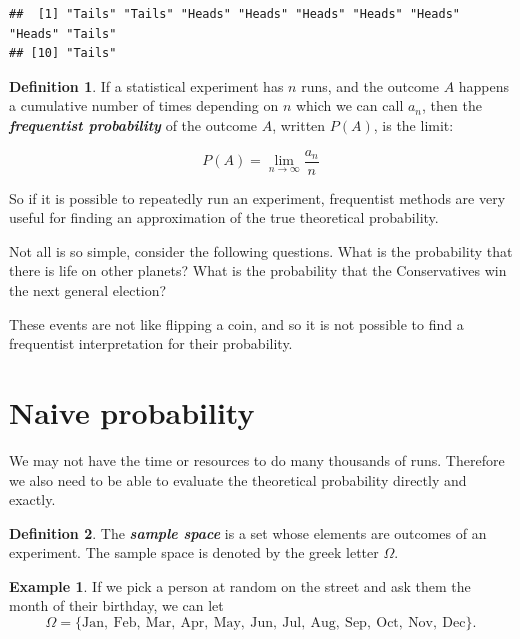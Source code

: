 \documentclass[
]{book}
\theoremstyle{definition}
\newtheorem{definition}{Definition}[chapter]
\theoremstyle{definition}
\newtheorem{example}{Example}[chapter]
\theoremstyle{definition}
\theoremstyle{definition}
\theoremstyle{remark}
\begin{document}
\begin{verbatim}
##  [1] "Tails" "Tails" "Heads" "Heads" "Heads" "Heads" "Heads" "Heads" "Tails"
## [10] "Tails"
\end{verbatim}

\begin{definition}
\protect\hypertarget{def:freq}{}\label{def:freq}If a statistical experiment has \(n\) runs, and the outcome \(A\) happens a cumulative number of times depending on \(n\) which we can call \(a_n\), then the \textbf{\emph{frequentist probability}} of the outcome \(A\), written \(P(A)\), is the limit:

\[P(A) = \lim_{n\to \infty} \frac{a_n}{n}\]
\end{definition}

So if it is possible to repeatedly run an experiment, frequentist methods are very useful for finding an approximation of the true theoretical probability.

Not all is so simple, consider the following questions. What is the probability that there is life on other planets? What is the probability that the Conservatives win the next general election?

These events are not like flipping a coin, and so it is not possible to find a frequentist interpretation for their probability.

\hypertarget{naive-probability}{%
\section{Naive probability}\label{naive-probability}}

We may not have the time or resources to do many thousands of runs. Therefore we also need to be able to evaluate the theoretical probability directly and exactly.

\begin{definition}
\protect\hypertarget{def:samplespace}{}\label{def:samplespace}The \textbf{\emph{sample space}} is a set whose elements are outcomes of an experiment. The sample space is denoted by the greek letter \(\Omega\).
\end{definition}

\begin{example}
\protect\hypertarget{exm:monthspace}{}\label{exm:monthspace}If we pick a person at random on the street and ask them the month of their birthday,
we can let
\[\Omega = \{\text{Jan}, \ \text{Feb}, \ \text{Mar},  \ \text{Apr}, \ \text{May}, \ \text{Jun}, \ \text{Jul}, \ \text{Aug}, \ \text{Sep}, \ \text{Oct}, \ \text{Nov}, \ \text{Dec} \}.\]
\end{example}
\end{document}
